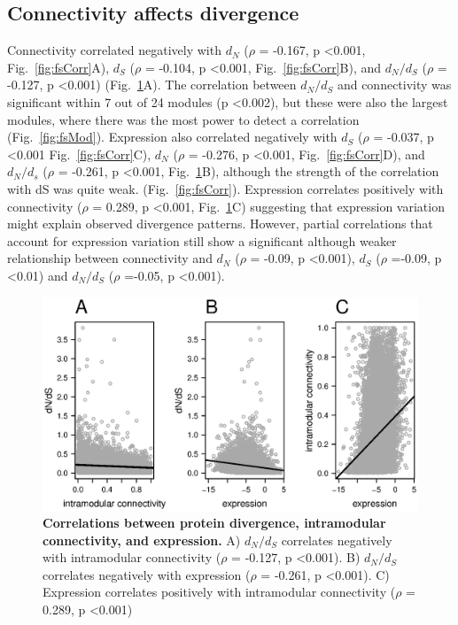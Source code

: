 \subsection{Connectivity affects divergence}
Connectivity correlated negatively with  $d_{N}$ ($\rho$ = -0.167, p \textless 0.001,  Fig.~\ref{fig:fsCorr}A), $d_{S}$ ($\rho$ = -0.104, p \textless 0.001, Fig.~\ref{fig:fsCorr}B), and $d_{N}/d_{S}$ ($\rho$ = -0.127, p \textless 0.001) (Fig.~\ref{fig:f1}A). The correlation between $d_{N}/d_{S}$ and connectivity was significant within 7 out of 24 modules (p \textless 0.002), but these were also the largest modules, where there was the most power to detect a correlation (Fig.~\ref{fig:fsMod}). Expression also correlated negatively with $d_{S}$ ($\rho$ = -0.037, p \textless 0.001 Fig.~\ref{fig:fsCorr}C), $d_{N}$ ($\rho$ = -0.276, p \textless 0.001, Fig.~\ref{fig:fsCorr}D), and $d_{N}/d_{s}$ ($\rho$ = -0.261, p \textless 0.001, Fig.~\ref{fig:f1}B),  although the strength of the correlation with dS was quite weak. (Fig.~\ref{fig:fsCorr}). Expression correlates positively with connectivity ($\rho$ = 0.289, p \textless 0.001, Fig.~\ref{fig:f1}C) suggesting that expression variation might explain observed divergence patterns. However, partial correlations that account for expression variation still show a significant although weaker relationship between connectivity and $d_{N}$ ($\rho$ = -0.09, p \textless 0.001), $d_{S}$ ($\rho$ =-0.09, p \textless 0.01) and $d_{N}/d_{S}$ ($\rho$ =-0.05, p \textless 0.001). 

\begin{figure}[ht!]
\centering
\includegraphics[width=\linewidth]{Ch4Fig1}
\caption{\textbf{Correlations between protein divergence, intramodular connectivity, and expression.} A) $d_{N}/d_{S}$ correlates negatively with intramodular connectivity ($\rho$ = -0.127, p \textless 0.001). B) $d_{N}/d_{S}$ correlates negatively with expression ($\rho$ = -0.261, p \textless 0.001). C) Expression correlates positively with intramodular connectivity ($\rho$ = 0.289, p \textless 0.001)}
\label{fig:f1}
\end{figure}

